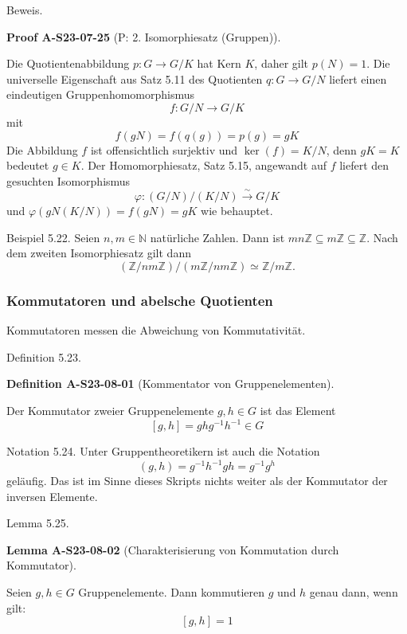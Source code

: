 \documentclass[10pt, letterpaper]{article}
\newcommand{\CustomHeading}[3]{%
  \par\medskip\noindent%
  \textbf{#1 #2} \textnormal{(#3)}.\enskip%
}
\newenvironment{DEF}[2]{\begin{unitbox}\CustomHeading{Definition}{#1}{#2}}{\end{unitbox}}
\newenvironment{LEM}[2]{\begin{unitbox}\CustomHeading{Lemma}{#1}{#2}}{\end{unitbox}}
\newenvironment{PROOF}[2]{\begin{unitbox}\CustomHeading{Proof}{#1}{#2}}{\end{unitbox}}
\begin{document}
Beweis. 

\begin{PROOF}{A-S23-07-25}{P: 2. Isomorphiesatz (Gruppen)}
Die Quotientenabbildung $p: G \rightarrow G / K$ hat Kern $K$, daher gilt $p(N)=1$. Die universelle Eigenschaft aus Satz 5.11 des Quotienten $q: G \rightarrow G / N$ liefert einen eindeutigen Gruppenhomomorphismus
$$
f: G / N \rightarrow G / K
$$
mit
$$
f(g N)=f(q(g))=p(g)=g K
$$
Die Abbildung $f$ ist offensichtlich surjektiv und $\operatorname{ker}(f)=K / N$, denn $g K=K$ bedeutet $g \in K$. Der Homomorphiesatz, Satz 5.15, angewandt auf $f$ liefert den gesuchten Isomorphismus
$$
\varphi:(G / N) /(K / N) \xrightarrow{\sim} G / K
$$
und $\varphi(g N(K / N))=f(g N)=g K$ wie behauptet.
\end{PROOF}


Beispiel 5.22. Seien $n, m \in \mathbb{N}$ natürliche Zahlen. Dann ist $m n \mathbb{Z} \subseteq m \mathbb{Z} \subseteq \mathbb{Z}$. Nach dem zweiten Isomorphiesatz gilt dann
$$
(\mathbb{Z} / n m \mathbb{Z}) /(m \mathbb{Z} / n m \mathbb{Z}) \simeq \mathbb{Z} / m \mathbb{Z} .
$$



\pagebreak


\subsubsection{Kommutatoren und abelsche Quotienten} 


Kommutatoren messen die Abweichung von Kommutativität.

Definition 5.23. 



\begin{DEF}{A-S23-08-01}{Kommentator von Gruppenelementen}
Der Kommutator zweier Gruppenelemente $g, h \in G$ ist das Element
$$
[g, h]=g h g^{-1} h^{-1} \in G
$$
\end{DEF}


Notation 5.24. Unter Gruppentheoretikern ist auch die Notation
$$
(g, h)=g^{-1} h^{-1} g h=g^{-1} g^{h}
$$
geläufig. Das ist im Sinne dieses Skripts nichts weiter als der Kommutator der inversen Elemente.


Lemma 5.25. 

\begin{LEM}{A-S23-08-02}{Charakterisierung von Kommutation durch Kommutator}
Seien $g, h \in G$ Gruppenelemente. Dann kommutieren $g$ und $h$ genau dann, wenn gilt:
$$
[g, h]=1
$$
\end{LEM}
\end{document}
